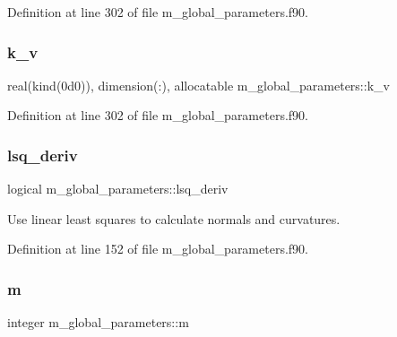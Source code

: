 Definition at line 302 of file m\+\_\+global\+\_\+parameters.\+f90.

\mbox{\label{namespacem__global__parameters_a1943ea5a5127e94a197afae57be95758}} 
\subsubsection{\texorpdfstring{k\+\_\+v}{k\_v}}
{\footnotesize\ttfamily real(kind(0d0)), dimension(\+:), allocatable m\+\_\+global\+\_\+parameters\+::k\+\_\+v}



Definition at line 302 of file m\+\_\+global\+\_\+parameters.\+f90.

\mbox{\label{namespacem__global__parameters_ad367bbe26f93b9fd058c58ec11337fdf}} 
\subsubsection{\texorpdfstring{lsq\+\_\+deriv}{lsq\_deriv}}
{\footnotesize\ttfamily logical m\+\_\+global\+\_\+parameters\+::lsq\+\_\+deriv}



Use linear least squares to calculate normals and curvatures. 



Definition at line 152 of file m\+\_\+global\+\_\+parameters.\+f90.

\mbox{\label{namespacem__global__parameters_aee38c9d03e9195858a93ec611b605f33}} 
\subsubsection{\texorpdfstring{m}{m}}
{\footnotesize\ttfamily integer m\+\_\+global\+\_\+parameters\+::m}



